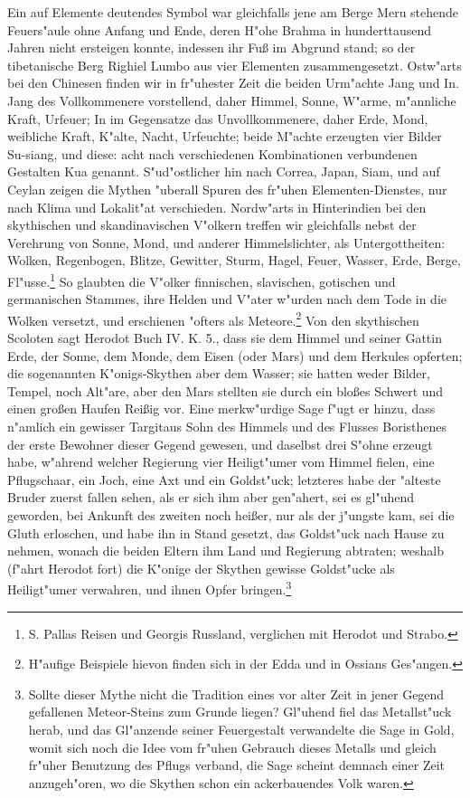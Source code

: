 \documentclass[a4paper, 11pt, oneside, polutonikogreek, german]{article}
\begin{document}
Ein auf Elemente deutendes Symbol war gleichfalls jene am Berge Meru stehende Feuers"aule ohne Anfang und Ende, deren H"ohe Brahma in hunderttausend Jahren nicht ersteigen konnte, indessen ihr Fuß im Abgrund stand; so der tibetanische Berg Righiel Lumbo aus vier Elementen zusammengesetzt. Ostw"arts bei den Chinesen finden wir in fr"uhester Zeit die beiden Urm"achte Jang und In. Jang des Vollkommenere vorstellend, daher Himmel, Sonne, W"arme, m"annliche Kraft, Urfeuer; In im Gegensatze das Unvollkommenere, daher Erde, Mond, weibliche Kraft, K"alte, Nacht, Urfeuchte; beide M"achte erzeugten vier Bilder Su-siang, und diese: acht nach verschiedenen Kombinationen verbundenen Gestalten Kua genannt. S"ud"ostlicher hin nach Correa, Japan, Siam, und auf Ceylan zeigen die Mythen "uberall Spuren des fr"uhen Elementen-Dienstes, nur nach Klima und Lokalit"at verschieden. Nordw"arts in Hinterindien bei den skythischen und skandinavischen V"olkern treffen wir gleichfalls nebst der Verehrung von Sonne, Mond, und anderer Himmelslichter, als Untergottheiten: Wolken, Regenbogen, Blitze, Gewitter, Sturm, Hagel, Feuer, Wasser, Erde, Berge, Fl"usse.\footnote{S. Pallas Reisen und Georgis Russland, verglichen mit Herodot und Strabo.} So glaubten die V"olker finnischen, slavischen, gotischen und germanischen Stammes, ihre Helden und V"ater w"urden nach dem Tode in die Wolken versetzt, und erschienen "ofters als Meteore.\footnote{H"aufige Beispiele hievon finden sich in der Edda und in Ossians Ges"angen.} Von den skythischen Scoloten sagt Herodot Buch IV. K. 5., dass sie dem Himmel und seiner Gattin Erde, der Sonne, dem Monde, dem Eisen (oder Mars) und dem Herkules opferten; die sogenannten K"onigs-Skythen aber dem Wasser; sie hatten weder Bilder, Tempel, noch Alt"are, aber den Mars stellten sie durch ein bloßes Schwert und einen großen Haufen Reißig vor. Eine merkw"urdige Sage f"ugt er hinzu, dass n"amlich ein gewisser Targitaus Sohn des Himmels und des Flusses Boristhenes der erste Bewohner dieser Gegend gewesen, und daselbst drei S"ohne erzeugt habe, w"ahrend welcher Regierung vier Heiligt"umer vom Himmel fielen, eine Pflugschaar, ein Joch, eine Axt und ein Goldst"uck; letzteres habe der "alteste Bruder zuerst fallen sehen, als er sich ihm aber gen"ahert, sei es gl"uhend geworden, bei Ankunft des zweiten noch heißer, nur als der j"ungste kam, sei die Gluth erloschen, und habe ihn in Stand gesetzt, das Goldst"uck nach Hause zu nehmen, wonach die beiden Eltern ihm Land und Regierung abtraten; weshalb (f"ahrt Herodot fort) die K"onige der Skythen gewisse Goldst"ucke als Heiligt"umer verwahren, und ihnen Opfer bringen.\footnote{Sollte dieser Mythe nicht die Tradition eines vor alter Zeit in jener Gegend gefallenen Meteor-Steins zum Grunde liegen? Gl"uhend fiel das Metallst"uck herab, und das Gl"anzende seiner Feuergestalt verwandelte die Sage in Gold, womit sich noch die Idee vom fr"uhen Gebrauch dieses Metalls und gleich fr"uher Benutzung des Pflugs verband, die Sage scheint demnach einer Zeit anzugeh"oren, wo die Skythen schon ein ackerbauendes Volk waren.}
\end{document}

